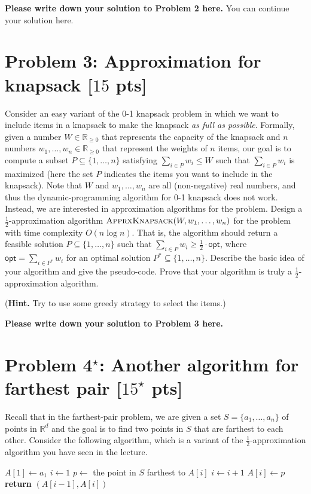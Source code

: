 \documentclass[letterpaper, 11pt]{article}
\newcommand{\1}{\mathds{1}}	%
\theoremstyle{definition}
\newcommand{\problem}[1]{\section*{Problem #1}}
\newenvironment{solution}{{\par\noindent\it Solution.}}{}
\begin{document}
\begin{solution}
\textbf{Please write down your solution to Problem 2 here.}
\clearpage
You can continue your solution here.
\end{solution}
\clearpage


\problem{3: Approximation for knapsack [$15$ pts]}

Consider an easy variant of the 0-1 knapsack problem in which we want to include items in a knapsack to make the knapsack \textit{as full as possible}.
Formally, given a number $W \in \mathbb{R}_{\geq 0}$ that represents the capacity of the knapsack and $n$ numbers $w_1,\dots,w_n \in \mathbb{R}_{\geq 0}$ that represent the weights of $n$ items, our goal is to compute a subset $P \subseteq \{1,\dots,n\}$ satisfying $\sum_{i \in P} w_i \leq W$ such that $\sum_{i \in P} w_i$ is maximized (here the set $P$ indicates the items you want to include in the knapsack).
Note that $W$ and $w_1,\dots,w_n$ are all (non-negative) real numbers, and thus the dynamic-programming algorithm for 0-1 knapsack does not work.
Instead, we are interested in approximation algorithms for the problem.
Design a $\frac{1}{2}$-approximation algorithm $\textsc{ApprxKnapsack}(W,w_1,\dots,w_n)$ for the problem with time complexity $O(n \log n)$.
That is, the algorithm should return a feasible solution $P \subseteq \{1,\dots,n\}$ such that $\sum_{i \in P} w_i \geq \frac{1}{2} \cdot \mathsf{opt}$, where $\mathsf{opt} = \sum_{i \in P^*} w_i$ for an optimal solution $P^* \subseteq \{1,\dots,n\}$.
Describe the basic idea of your algorithm and give the pseudo-code.
Prove that your algorithm is truly a $\frac{1}{2}$-approximation algorithm.

(\textbf{Hint.} Try to use some greedy strategy to select the items.)

\begin{solution}
\textbf{Please write down your solution to Problem 3 here.}
\end{solution}
\clearpage


\problem{4$^\star$: Another algorithm for farthest pair [$15^\star$ pts]}

Recall that in the farthest-pair problem, we are given a set $S = \{a_1,\dots,a_n\}$ of points in $\mathbb{R}^d$ and the goal is to find two points in $S$ that are farthest to each other.
Consider the following algorithm, which is a variant of the $\frac{1}{2}$-approximation algorithm you have seen in the lecture.

\begin{algorithm}[h]
    \caption{\textsc{FarthestPair}$(S = \{a_1,\dots,a_n\})$}
	\begin{algorithmic}
        \State $A[1] \leftarrow a_1$
        \State $i \leftarrow 1$
            \State $p \leftarrow$ the point in $S$ farthest to $A[i]$
            \State $i \leftarrow i+1$
            \State $A[i] \leftarrow p$
            \EndIf
        \EndWhile
        \State \textbf{return} $(A[i-1],A[i])$
	\end{algorithmic}
	\label{alg-top}
\end{algorithm}
\end{document}
